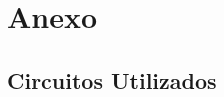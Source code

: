 \newpage
\section{Anexo}
    \listoffigures
    \newpage
    
    \subsection{Circuitos Utilizados}
        